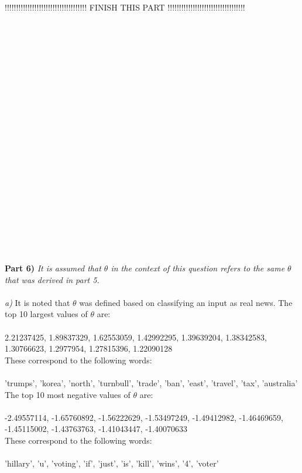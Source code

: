 \documentclass{article}
\begin{document}
!!!!!!!!!!!!!!!!!!!!!!!!!!!!!!!!!!!! FINISH THIS PART !!!!!!!!!!!!!!!!!!!!!!!!!!!!!!!!!!\\\\\\\\\\\\\\\\\\\\\\\\\\\\\\\\\\\\\\\











\\\\
\textbf{Part 6)}
\textit{It is assumed that $\theta$ in the context of this question refers to the same $\theta$ that was derived in part 5.\\\\a)} It is noted that $\theta$ was defined based on classifying an input as real news. The top 10 largest values of $\theta$ are:\\\\
2.21237425, 1.89837329, 1.62553059, 1.42992295, 1.39639204, 1.38342583, 1.30766623, 1.2977954,  1.27815396, 1.22090128\\

These correspond to the following words:\\\\
'trumps', 'korea', 'north', 'turnbull', 'trade', 'ban', 'east', 'travel', 'tax', 'australia'\\

The top 10 most negative values of $\theta$ are:\\\\
-2.49557114, -1.65760892, -1.56222629, -1.53497249, -1.49412982, -1.46469659, -1.45115002, -1.43763763, -1.41043447, -1.40070633\\

These correspond to the following words:\\\\
'hillary', 'u', 'voting', 'if', 'just', 'is', 'kill', 'wins', '4', 'voter'\\
\end{document}
